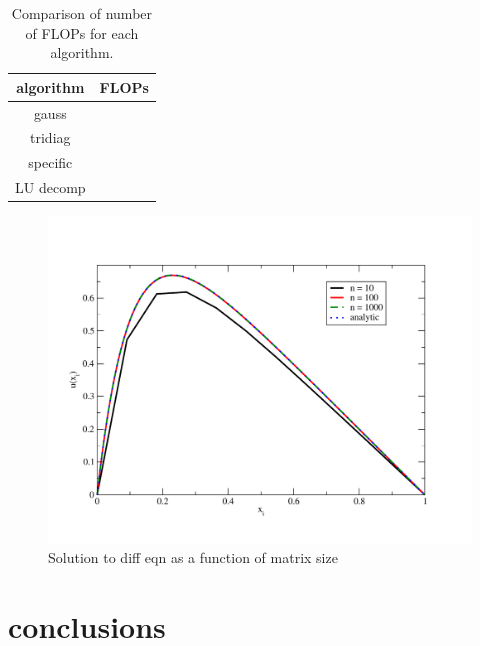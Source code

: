 \documentclass[prc,amsmath,twocolumn,superscriptaddress]{revtex4}
\begin{document}
\begin{table}[h]
\centering
\begin{tabular}{|c|c|}
\hline
algorithm& FLOPs\\
\hline
gauss&\\
tridiag&\\
specific&\\
LU  decomp&\\
\hline
\end{tabular}
\caption{Comparison of number of FLOPs for each algorithm.}
\label{flop_table}
\end{table}

\begin{figure}[t]
\includegraphics[scale=0.35]{output}
\caption{Solution to diff eqn as a function of matrix size}
\label{output}
\end{figure}

\section{conclusions}
\label{conc}


\end{document}
